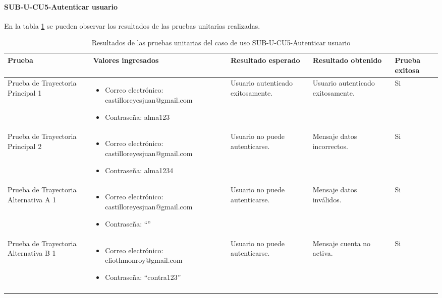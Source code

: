 \paragraph{SUB-U-CU5-Autenticar usuario}\label{SUB-U-CU5:Pruebas}
En la tabla \ref{pruebas_unitarias_sub-u-cu5} se pueden observar los resultados de las pruebas unitarias realizadas.
\begin{longtable}{|M{2cm}| M{4.5cm}|M{3cm}|M{3cm}|M{1.5cm}|}
	\hline
	\textbf{Prueba} & \textbf{Valores ingresados} & \textbf{Resultado esperado} & \textbf{Resultado obtenido} & \textbf{Prueba exitosa} \\ \hline
	Prueba de Trayectoria Principal 1 & 
	\begin{itemize}
		\item Correo electrónico: castilloreyesjuan@gmail.com
		\item Contraseña: alma123
	\end{itemize}
	& 
	Usuario autenticado exitosamente.
	&
	Usuario autenticado exitosamente.
	& Si \\ \hline

	Prueba de Trayectoria Principal 2 & 
	\begin{itemize}
		\item Correo electrónico: castilloreyesjuan@gmail.com
		\item Contraseña: alma1234
	\end{itemize}
	& 
	Usuario no puede autenticarse.
	&
	Mensaje datos incorrectos.
	& Si \\ \hline

	Prueba de Trayectoria Alternativa A 1 & 
	\begin{itemize}
		\item Correo electrónico: castilloreyesjuan@gmail.com
		\item Contraseña: ``''
	\end{itemize}
	& 
	Usuario no puede autenticarse.
	&
	Mensaje datos inválidos.
	& Si \\ \hline

	Prueba de Trayectoria Alternativa B 1 & 
	\begin{itemize}
		\item Correo electrónico: eliothmonroy@gmail.com
		\item Contraseña: ``contra123''
	\end{itemize}
	& 
	Usuario no puede autenticarse.
	&
	Mensaje cuenta no activa.
	& Si \\ \hline

	\caption{Resultados de las pruebas unitarias del caso de uso SUB-U-CU5-Autenticar usuario}
	\label{pruebas_unitarias_sub-u-cu5}
\end{longtable}